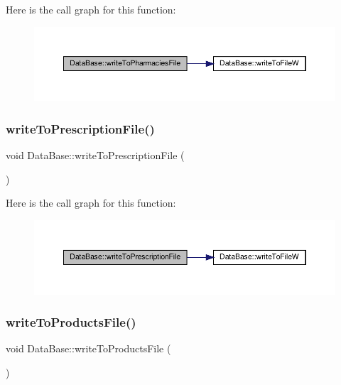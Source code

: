 Here is the call graph for this function\+:\nopagebreak
\begin{figure}[H]
\begin{center}
\leavevmode
\includegraphics[width=350pt]{classDataBase_aef0dc00d9d40159c361518e60e78f857_cgraph}
\end{center}
\end{figure}
\mbox{\label{classDataBase_a1435e1728598586503f199981b84a933}} 
\subsubsection{\texorpdfstring{write\+To\+Prescription\+File()}{writeToPrescriptionFile()}}
{\footnotesize\ttfamily void Data\+Base\+::write\+To\+Prescription\+File (\begin{DoxyParamCaption}{ }\end{DoxyParamCaption})}

Here is the call graph for this function\+:\nopagebreak
\begin{figure}[H]
\begin{center}
\leavevmode
\includegraphics[width=350pt]{classDataBase_a1435e1728598586503f199981b84a933_cgraph}
\end{center}
\end{figure}
\mbox{\label{classDataBase_a108ba0eb315d14ed6bc7181b98499318}} 
\subsubsection{\texorpdfstring{write\+To\+Products\+File()}{writeToProductsFile()}}
{\footnotesize\ttfamily void Data\+Base\+::write\+To\+Products\+File (\begin{DoxyParamCaption}{ }\end{DoxyParamCaption})}

